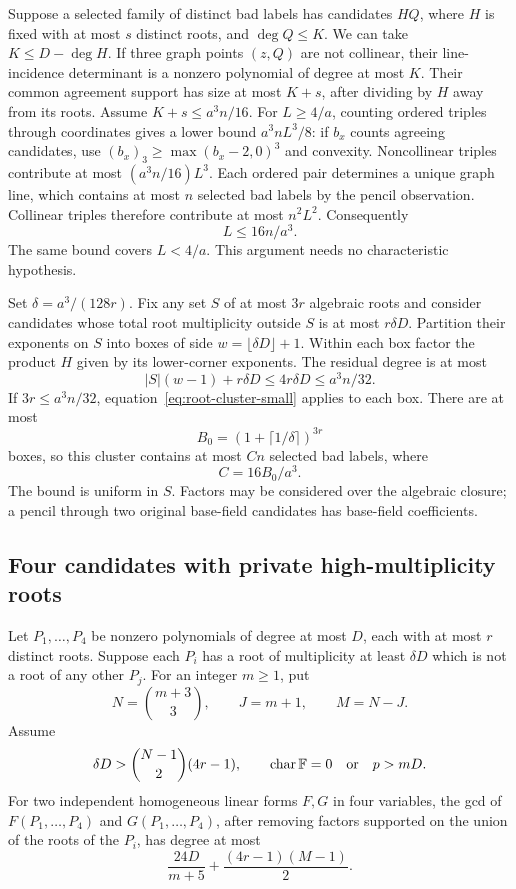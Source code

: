 Suppose a selected family of distinct bad labels has candidates $HQ$,
where $H$ is fixed with at most $s$ distinct roots, and $\deg Q\le K$.
We can take $K\le D-\deg H$. If three graph points $(z,Q)$ are not
collinear, their line-incidence determinant is a nonzero polynomial of
degree at most $K$. Their common agreement support has size at most
$K+s$, after dividing by $H$ away from its roots.
Assume $K+s\le a^3n/16$. For $L\ge4/a$, counting ordered triples
through coordinates gives a lower bound $a^3nL^3/8$: if $b_x$ counts
agreeing candidates, use
$(b_x)_3\ge\max(b_x-2,0)^3$ and convexity.
Noncollinear triples contribute at most $(a^3n/16)L^3$.
Each ordered pair determines a unique graph line, which contains at
most $n$ selected bad labels by the pencil observation. Collinear
triples therefore contribute at most $n^2L^2$. Consequently
\begin{equation}\label{eq:root-cluster-small}
 L\le16n/a^3.
\end{equation}
The same bound covers $L<4/a$. This argument needs no characteristic
hypothesis.

Set $\delta=a^3/(128r)$. Fix any set $S$ of at most $3r$ algebraic
roots and consider candidates whose total root multiplicity outside
$S$ is at most $r\delta D$. Partition their exponents on $S$ into
boxes of side $w=\lfloor\delta D\rfloor+1$. Within each box factor
the product $H$ given by its lower-corner exponents. The residual degree
is at most
\[
 |S|(w-1)+r\delta D\le4r\delta D\le a^3n/32.
\]
If $3r\le a^3n/32$, equation~\eqref{eq:root-cluster-small} applies
to each box. There are at most
\[
 B_0=(1+\lceil1/\delta\rceil)^{3r}
\]
boxes, so this cluster contains at most $Cn$ selected bad labels, where
\begin{equation}\label{eq:root-cluster-C}
 C=16B_0/a^3.
\end{equation}
The bound is uniform in $S$. Factors may be considered over the
algebraic closure; a pencil through two original base-field candidates
has base-field coefficients.

\subsection{Four candidates with private high-multiplicity roots}

\begin{lemma}\label{lem:bounded-root-gcd}
Let $P_1,\ldots,P_4$ be nonzero polynomials of degree at most $D$,
each with at most $r$ distinct roots. Suppose each $P_i$ has a root
of multiplicity at least $\delta D$ which is not a root of any other
$P_j$. For an integer $m\ge1$, put
\[
 N=\binom{m+3}{3},\qquad J=m+1,\qquad M=N-J.
\]
Assume
\[
 \delta D>\binom{N-1}{2}(4r-1),\qquad
 \operatorname{char}\mathbb F=0\quad\text{or}\quad p>mD.
\]
For two independent homogeneous linear forms $F,G$ in four variables,
the gcd of $F(P_1,\ldots,P_4)$ and $G(P_1,\ldots,P_4)$, after
removing factors supported on the union of the roots of the $P_i$,
has degree at most
\begin{equation}\label{eq:bounded-root-gcd}
 \frac{24D}{m+5}+\frac{(4r-1)(M-1)}2.
\end{equation}
\end{lemma}


